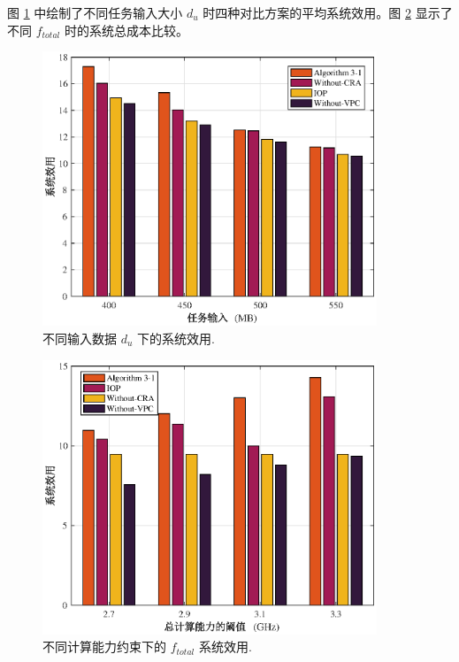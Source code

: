 图 \ref{F8} 中绘制了不同任务输入大小 $d_u$ 时四种对比方案的平均系统效用。图 \ref{F9} 显示了不同 $f_{total}$ 时的系统总成本比较。
\begin{figure}[H]
\centering
\includegraphics[width=10cm]{figures//chap3//diff_dup.eps}
\caption{不同输入数据 $d_u$ 下的系统效用.}
\label{F8}
\end{figure}
\begin{figure}[H]
\centering
\includegraphics[width=10cm]{figures//chap3//diff_total.eps}
\caption{不同计算能力约束下的 $f_{total}$ 系统效用.}
\label{F9}
\end{figure}

